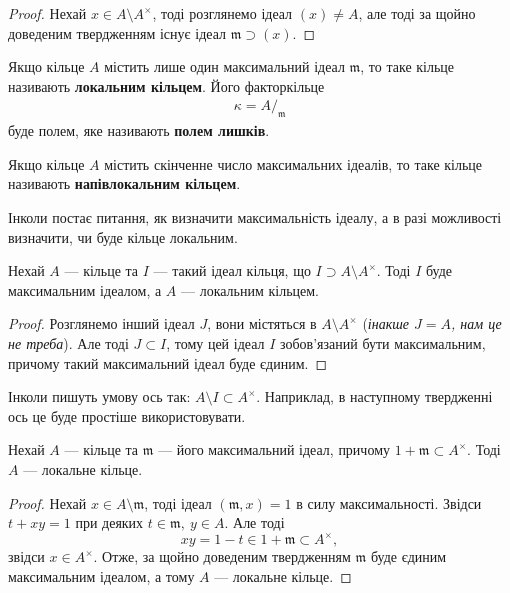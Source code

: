 \documentclass{math_library}
\begin{document}
\begin{proof}
Нехай $x \in A \setminus A^\times$, тоді розглянемо ідеал $(x) \neq A$, але тоді за щойно доведеним твердженням існує ідеал $\mathfrak{m} \supset (x)$.
\end{proof}

\begin{definition}
Якщо кільце $A$ містить лише один максимальний ідеал $\mathfrak{m}$, то таке кільце називають \textbf{локальним кільцем}. Його факторкільце
\begin{align*}
\kappa = A/_{\mathfrak{m}}
\end{align*}
буде полем, яке називають \textbf{полем лишків}.
\end{definition}

\begin{definition}
Якщо кільце $A$ містить скінченне число максимальних ідеалів, то таке кільце називають \textbf{напівлокальним кільцем}.
\end{definition}

Інколи постає питання, як визначити максимальність ідеалу, а в разі можливості визначити, чи буде кільце локальним.

\begin{proposition}
Нехай $A$ --- кільце та $I$ --- такий ідеал кільця, що $I \supset A \setminus A^\times$. Тоді $I$ буде максимальним ідеалом, а $A$ --- локальним кільцем.
\end{proposition}

\begin{proof}
Розглянемо інший ідеал $J$, вони містяться в $A \setminus A^\times$ (\textit{інакше $J = A$, нам це не треба}). Але тоді $J \subset I$, тому цей ідеал $I$ зобов'язаний бути максимальним, причому такий максимальний ідеал буде єдиним.
\end{proof}

Інколи пишуть умову ось так: $A \setminus I \subset A^\times$. Наприклад, в наступному твердженні ось це буде простіше використовувати.

\begin{proposition}
Нехай $A$ --- кільце та $\mathfrak{m}$ --- його максимальний ідеал, причому $1 + \mathfrak{m} \subset A^\times$. Тоді $A$ --- локальне кільце.
\end{proposition}

\begin{proof}
Нехай $x \in A \setminus \mathfrak{m}$, тоді ідеал $(\mathfrak{m},x) = 1$ в силу максимальності. Звідси $t + xy = 1$ при деяких $t \in \mathfrak{m},\ y \in A$. Але тоді 
\[
xy = 1-t \in 1 + \mathfrak{m} \subset A^\times,
\]
звідси $x \in A^\times$. Отже, за щойно доведеним твердженням $\mathfrak{m}$ буде єдиним максимальним ідеалом, а тому $A$ --- локальне кільце.
\end{proof}
\end{document}
